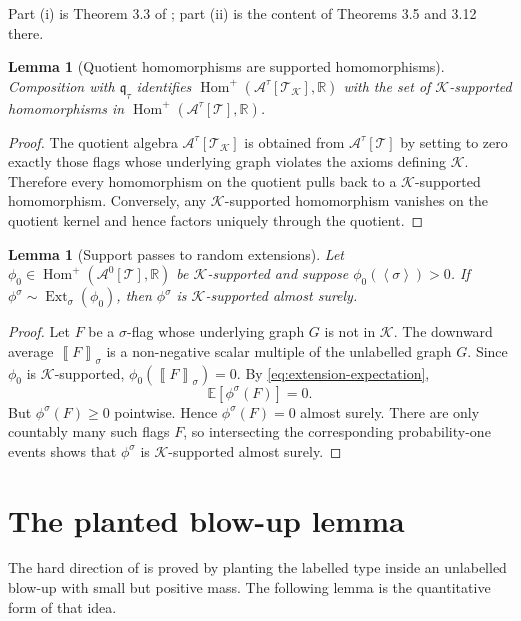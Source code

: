 \documentclass[11pt]{article}
\newtheorem{lemma}[theorem]{Lemma}
\theoremstyle{definition}
\newcommand{\R}{\mathbb{R}}
\newcommand{\E}{\mathbb{E}}
\newcommand{\A}{\mathcal{A}}
\newcommand{\K}{\mathcal{K}}
\newcommand{\T}{\mathcal{T}}
\newcommand{\Homp}{\operatorname{Hom}^{+}}
\newcommand{\Ext}{\operatorname{Ext}}
\newcommand{\brak}[1]{\left\langle #1\right\rangle}
\newcommand{\avg}[2]{\left\llbracket #1 \right\rrbracket_{#2}}
\newcommand{\q}{\mathfrak q}
\begin{document}
Part (i) is Theorem 3.3 of \cite{Razborov2007}; part (ii) is the content of
Theorems 3.5 and 3.12 there.

\begin{lemma}[Quotient homomorphisms are supported homomorphisms]\label{lem:quotient-support}
Composition with $\q_\tau$ identifies $\Homp(\A^\tau[\T_\K],\R)$ with the set
of $\K$-supported homomorphisms in $\Homp(\A^\tau[\T],\R)$.
\end{lemma}

\begin{proof}
The quotient algebra $\A^\tau[\T_\K]$ is obtained from $\A^\tau[\T]$ by setting
to zero exactly those flags whose underlying graph violates the axioms defining
$\K$.  Therefore every homomorphism on the quotient pulls back to a
$\K$-supported homomorphism.  Conversely, any $\K$-supported homomorphism
vanishes on the quotient kernel and hence factors uniquely through the quotient.
\end{proof}

\begin{lemma}[Support passes to random extensions]\label{lem:support-passes}
Let $\phi_0\in\Homp(\A^0[\T],\R)$ be $\K$-supported and suppose
$\phi_0(\brak\sigma)>0$.  If $\phi^\sigma\sim\Ext_\sigma(\phi_0)$, then
$\phi^\sigma$ is $\K$-supported almost surely.
\end{lemma}

\begin{proof}
Let $F$ be a $\sigma$-flag whose underlying graph $G$ is not in $\K$.  The
downward average $\avg{F}{\sigma}$ is a non-negative scalar multiple of the
unlabelled graph $G$.  Since $\phi_0$ is $\K$-supported,
$\phi_0(\avg{F}{\sigma})=0$.  By \eqref{eq:extension-expectation},
\[
  \E[\phi^\sigma(F)]=0.
\]
But $\phi^\sigma(F)\ge0$ pointwise.  Hence $\phi^\sigma(F)=0$ almost surely.
There are only countably many such flags $F$, so intersecting the corresponding
probability-one events shows that $\phi^\sigma$ is $\K$-supported almost surely.
\end{proof}

\section{The planted blow-up lemma}

The hard direction of  is proved by planting the labelled type
inside an unlabelled blow-up with small but positive mass.  The following lemma
is the quantitative form of that idea.
\end{document}
